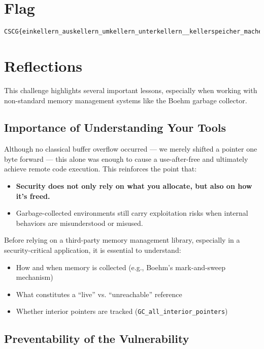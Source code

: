 \documentclass[a4paper,11pt]{article}
\begin{document}
\section{Flag}
\begin{lstlisting}
CSCG{einkellern_auskellern_umkellern_unterkellern__kellerspeicher_machen_spass}
\end{lstlisting}

\section{Reflections}

This challenge highlights several important lessons, especially when working with non-standard memory management systems like the Boehm garbage collector.

\subsection*{Importance of Understanding Your Tools}

Although no classical buffer overflow occurred — we merely shifted a pointer one byte forward — this alone was enough to cause a use-after-free and ultimately achieve remote code execution. This reinforces the point that:

\begin{itemize}
    \item \textbf{Security does not only rely on what you allocate, but also on how it's freed.}
    \item Garbage-collected environments still carry exploitation risks when internal behaviors are misunderstood or misused.
\end{itemize}

Before relying on a third-party memory management library, especially in a security-critical application, it is essential to understand:
\begin{itemize}
    \item How and when memory is collected (e.g., Boehm’s mark-and-sweep mechanism)
    \item What constitutes a “live” vs. “unreachable” reference
    \item Whether interior pointers are tracked (\texttt{GC\_all\_interior\_pointers})
\end{itemize}

\subsection*{Preventability of the Vulnerability}
\end{document}

